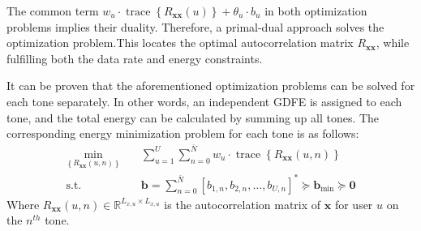 The common term $w_u \cdot \operatorname{trace}\left\{R_{\boldsymbol{x} \boldsymbol{x}}(u)\right\} + \theta_u \cdot b_u$ in both optimization problems implies their duality. Therefore, a primal-dual approach solves the optimization problem.This locates the optimal autocorrelation matrix $R_{\boldsymbol{xx}}$, while fulfilling both the data rate and energy constraints. 


It can be proven that the aforementioned optimization problems can be solved for each tone separately. In other words, an independent GDFE is assigned to each tone, and the total energy can be calculated by summing up all tones\cite{book}. The corresponding energy minimization problem for each tone is as follows:
\begin{equation} \label{tonalE}
    \begin{aligned}
        \min_{\left\{R_{\boldsymbol{x} \boldsymbol{x}}{(u, n)}\right\}} \quad &\sum_{u=1}^U \sum_{n=0}^{\bar{N}} w_u \cdot \operatorname{trace}\left\{R_{\boldsymbol{x} \boldsymbol{x}}(u, n)\right\} \\
        \textrm{s.t.} \quad &\mathbf{b}=\sum_{n=0}^{\bar{N}}\left[b_{1, n}, b_{2, n}, \ldots ,b_{U, n}\right]^* \succeq \boldsymbol{b}_{\min } \succeq \mathbf{0}
    \end{aligned}
\end{equation}
Where $R_{\boldsymbol{xx}}(u,n)\in\mathbb{R}^{L_{x,u}\times L_{x,u}}$ is the autocorrelation matrix of $\boldsymbol{x}$ for user $u$ on the $n^{th}$ tone. 

